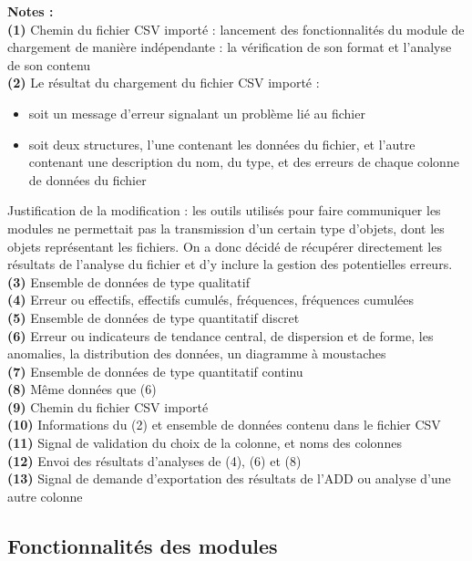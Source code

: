 		\textbf{Notes :}\\
			\textbf{({\color{red}1})} Chemin du fichier CSV importé : lancement des fonctionnalités du module de chargement de manière indépendante : la vérification de son format et l'analyse de son contenu\\
			\textbf{({\color{red}2})} Le résultat du chargement du fichier CSV importé :
			\begin{itemize}
				\item soit un message d'erreur signalant un problème lié au fichier
				\item soit deux structures, l'une contenant les données du fichier, et l'autre contenant une description du nom, du type, et des erreurs de chaque colonne de données du fichier
			\end{itemize}
			{\color{red}Justification de la modification :} les outils utilisés pour faire communiquer les modules ne permettait pas la transmission d'un certain type d'objets, dont les objets représentant les fichiers. On a donc décidé de récupérer directement les résultats de l'analyse du fichier et d'y inclure la gestion des potentielles erreurs.\\
			\textbf{(3)} Ensemble de données de type qualitatif\\
			\textbf{(4)} Erreur ou effectifs, effectifs cumulés, fréquences, fréquences cumulées\\
			\textbf{(5)} Ensemble de données de type quantitatif discret\\
			\textbf{(6)} Erreur ou indicateurs de tendance central, de dispersion et de forme, les anomalies, la distribution des données, un diagramme à moustaches\\
			\textbf{(7)} Ensemble de données de type quantitatif continu\\
			\textbf{(8)} Même données que (6)\\
			\textbf{(9)} Chemin du fichier CSV importé \\
			\textbf{(10)} Informations du (2) et ensemble de données contenu dans le fichier CSV \\
			\textbf{(11)} Signal de validation du choix de la colonne, et noms des colonnes\\
			\textbf{(12)} Envoi des résultats d'analyses de (4), (6) et (8)\\
			\textbf{(13)} Signal de demande d'exportation des résultats de l'ADD ou analyse d'une autre colonne\\		
		
		\subsection{Fonctionnalités des modules}
